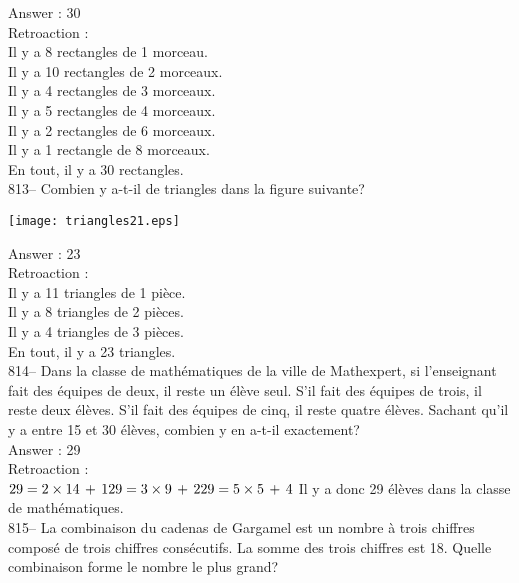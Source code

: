 ﻿\documentclass[letterpaper, 12pt]{article}
\begin{document}
Answer : 30\\

Retroaction : \\
Il y a 8 rectangles de 1 morceau.\\
Il y a 10 rectangles de 2 morceaux.\\
Il y a 4 rectangles de 3 morceaux.\\
Il y a 5 rectangles de 4 morceaux.\\
Il y a 2 rectangles de 6 morceaux.\\
Il y a 1 rectangle de 8 morceaux.\\
En tout, il y a 30 rectangles.\\

813-- Combien y a-t-il de triangles dans la figure suivante?\\
    \begin{center}
    \texttt{[image: triangles21.eps]}
    \end{center}

Answer : 23\\

Retroaction : \\
Il y a 11 triangles de 1 pi\`ece.\\
Il y a 8 triangles de 2 pi\`eces.\\
Il y a 4 triangles de 3 pi\`eces.\\
En tout, il y a 23 triangles.\\

814--  Dans la classe de math\'ematiques de la ville de  Mathexpert, si
l'enseignant fait des \'equipes de deux, il reste un \'el\`eve seul.  S'il
fait des \'equipes de trois, il reste deux \'el\`eves.  S'il fait des
\'equipes de cinq, il reste quatre \'el\`eves. Sachant qu'il y a entre 15 et
30 \'el\`eves, combien y en a-t-il exactement?\\

Answer : 29\\

Retroaction : \\
$29=2\times14\,+\,1\\
29=3\times9\,+\,2\\
29=5\times5\,+\,4\\$
Il y a donc 29 \'el\`eves dans la classe de math\'ematiques.  \\

815-- La combinaison du cadenas de Gargamel est un nombre \`a trois chiffres
compos\'e de trois chiffres cons\'ecutifs.  La somme des trois chiffres est
18.  Quelle combinaison forme le nombre le plus grand?\\
\end{document}
